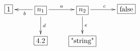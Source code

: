 $\xymatrix{
   \fbox{1} & \fbox{$n_1$} \ar[l]^{b} \ar[d]^{d} \ar[r]^{a} & \fbox{$n_2$} \ar[r]^{c} \ar[d]^{e} & \fbox{false} \\
   & \fbox{4.2} & \fbox{"string"}
}$
